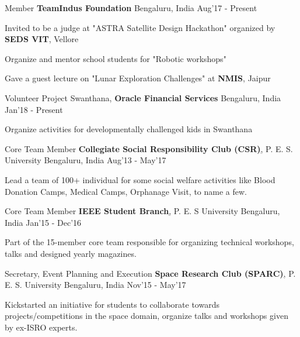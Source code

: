 \begin{cventries}
	\cventry
	{Member}
	{\textbf{TeamIndus Foundation}}
	{Bengaluru, India}
	{Aug'17 - Present}
	{
		\begin{cvitems}
		\item{Invited to be a judge at "ASTRA Satellite Design Hackathon" organized by \textbf{SEDS VIT}, Vellore}
		\item{Organize and mentor school students for "Robotic workshops"}
		\item{Gave a guest lecture on "Lunar Exploration Challenges" at \textbf{NMIS}, Jaipur}
		\end{cvitems}
	}

	\cventry
	{Volunteer}
	{Project Swanthana, \textbf{Oracle Financial Services}}
	{Bengaluru, India}
	{Jan'18 - Present}
	{
		\begin{cvitems}
		\item{Organize activities for developmentally challenged kids in Swanthana}
		\end{cvitems}
	}

	\cventry
	{Core Team Member}
	{\textbf{Collegiate Social Responsibility Club (CSR)}\href{http://pes.edu/clubs/pes-csr-club/}, P. E. S. University}
	{Bengaluru, India}
	{Aug'13 - May'17}
	{
		\begin{cvitems}
		\item{Lead a team of 100+ individual for some social welfare activities like Blood Donation Camps, Medical Camps, Orphanage Visit, to name a few.}
		\end{cvitems}
	}

	\cventry
	{Core Team Member}
	{\textbf{IEEE Student Branch}\href{http://ieee.pes.edu/}, P. E. S University}
	{Bengaluru, India}
	{Jan'15 - Dec'16}
	{
		\begin{cvitems}
		\item{Part of the 15-member core team responsible for organizing technical workshops, talks and designed yearly magazines.}
		\end{cvitems}
	}

	\cventry
	{Secretary, Event Planning and Execution}
	{\textbf{Space Research Club (SPARC)}\href{https://www.facebook.com/Space-Research-Club-Of-PES-University-487153011445398/?tn-str=k*F}, P. E. S. University}
	{Bengaluru, India}
	{Nov'15 - May'17}
	{
		\begin{cvitems}
		\item{Kickstarted an initiative for students to collaborate towards projects/competitions in the space domain, organize talks and workshops given by ex-ISRO experts.}
		\end{cvitems}
	}


\end{cventries}
